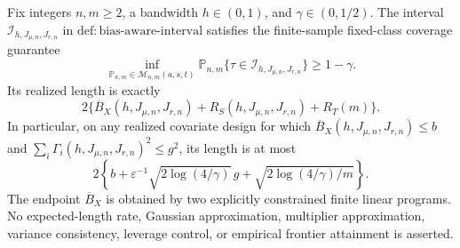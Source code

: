Fix integers \(n,m\ge2\), a bandwidth \(h\in(0,1)\), and \(\gamma\in(0,1/2)\). The interval \(\mathcal I_{h,J_{\mu,n},J_{r,n}}\) in \(\mathrm{def:bias\text{-}aware\text{-}interval}\) satisfies the finite-sample fixed-class coverage guarantee
\[
\inf_{\mathbb P_{n,m}\in\mathcal M_{n,m}(a,s,t)}
\mathbb P_{n,m}\{\tau\in\mathcal I_{h,J_{\mu,n},J_{r,n}}\}\ge1-\gamma.
\]
Its realized length is exactly
\[
2\{\overline B_X(h,J_{\mu,n},J_{r,n})+R_S(h,J_{\mu,n},J_{r,n})+R_T(m)\}.
\]
In particular, on any realized covariate design for which \(\overline B_X(h,J_{\mu,n},J_{r,n})\le b\) and \(\sum_i\Gamma_i(h,J_{\mu,n},J_{r,n})^2\le g^2\), its length is at most
\[
2\left\{b+\varepsilon^{-1}\sqrt{2\log(4/\gamma)}\,g+\sqrt{2\log(4/\gamma)/m}\right\}.
\]
The endpoint \(\overline B_X\) is obtained by two explicitly constrained finite linear programs. No expected-length rate, Gaussian approximation, multiplier approximation, variance consistency, leverage control, or empirical frontier attainment is asserted.